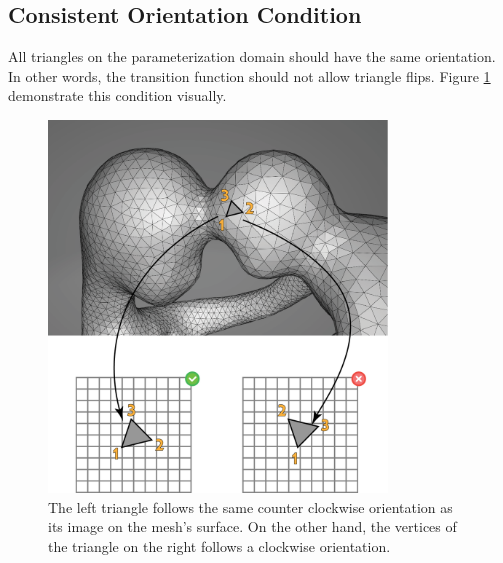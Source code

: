 \subsection{Consistent Orientation Condition}
\label{label:consistent_otrientation_cond}
All triangles on the parameterization domain should have the same orientation. In other words, the transition function should not allow triangle flips. Figure \ref{fig:orientation_req} demonstrate this condition visually.
\begin{figure}[ht]
\centering
\includegraphics[width=9cm]{figures/orientation/orientation.png}
\caption[The Orientation Requirement]{The left triangle follows the same counter clockwise orientation as its image on the mesh's surface. On the other hand, the vertices of the triangle on the right follows a clockwise orientation.}
\label{fig:orientation_req}
\end{figure}
